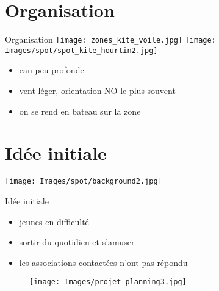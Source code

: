 \documentclass[10pt,a4paper]{beamer}
\begin{document}
\section{Organisation}
\begin{frame}{Organisation}
\texttt{[image: zones\_kite\_voile.jpg]} 
\texttt{[image: Images/spot/spot\_kite\_hourtin2.jpg]} 
\begin{itemize}
\item eau peu profonde
\item vent léger, orientation NO le plus souvent
\item on se rend en bateau sur la zone
\end{itemize}
\end{frame}

\section{Idée initiale}
{
{
   \texttt{[image: Images/spot/background2.jpg]}
}
\begin{frame}{Idée initiale}
\begin{itemize}
\item  jeunes en difficulté
\item  sortir du quotidien et s'amuser
\item les associations contactées n'ont pas répondu
\end{itemize}
\begin{figure}
\texttt{[image: Images/projet\_planning3.jpg]} 
\end{figure}
\end{frame}
}


\end{document}
